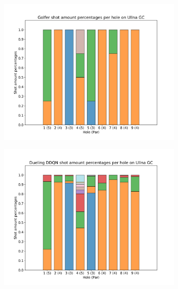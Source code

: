 \documentclass{kththesis}
\begin{document}
\begin{figure}
    \centering
    \begin{subfigure}{\textwidth}
    \centering
    \includegraphics[height=0.3\textheight]{L2Percentages/L2_Shot_Percentages_Ullna.png} 
    \end{subfigure}
    \begin{subfigure}{\textwidth}
    \centering
    \includegraphics[height=0.3\textheight]{AgentPercentages/DDDQN_Shot_Percentages_Ullna.png} 
    \end{subfigure}
    \begin{subfigure}{\textwidth}

\end{subfigure}
\end{figure}
\end{document}
